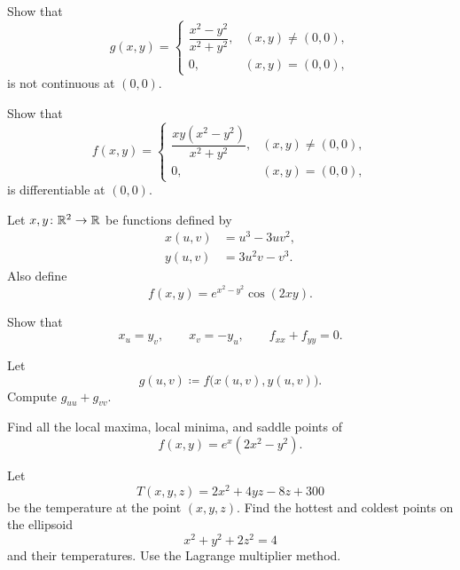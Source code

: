 \begin{problem}
\begin{problemsubparts}
\item Show that
\[
g(x,y)
=
\begin{cases}
\dfrac{x^2-y^2}{x^2+y^2}, & (x,y)\ne(0,0),\\[0.6em]
0, & (x,y)=(0,0),
\end{cases}
\]
is not continuous at $(0,0)$.
\item Show that
\[
f(x,y)
=
\begin{cases}
\dfrac{xy(x^2-y^2)}{x^2+y^2}, & (x,y)\ne(0,0),\\[0.6em]
0, & (x,y)=(0,0),
\end{cases}
\]
is differentiable at $(0,0)$.
\end{problemsubparts}
\end{problem}

\begin{problem}
Let $x,y\colon\mathbb{R}^2\to\mathbb{R}$ be functions defined by
\[
\begin{aligned}
x(u,v)&=u^3-3uv^2,\\
y(u,v)&=3u^2v-v^3.
\end{aligned}
\]
Also define
\[
f(x,y)=e^{x^2-y^2}\cos(2xy).
\]
\begin{problemsubparts}
\item Show that
\[
x_u=y_v,
\qquad
x_v=-y_u,
\qquad
f_{xx}+f_{yy}=0.
\]
\item Let
\[
g(u,v)\coloneqq f\bigl(x(u,v),y(u,v)\bigr).
\]
Compute $g_{uu}+g_{vv}$.
\end{problemsubparts}
\end{problem}

\begin{problem}
Find all the local maxima, local minima, and saddle points of
\[
f(x,y)=e^x(2x^2-y^2).
\]
\end{problem}

\begin{problem}
Let
\[
T(x,y,z)=2x^2+4yz-8z+300
\]
be the temperature at the point $(x,y,z)$. Find the hottest and coldest points on the ellipsoid
\[
x^2+y^2+2z^2=4
\]
and their temperatures. Use the Lagrange multiplier method.
\end{problem}

